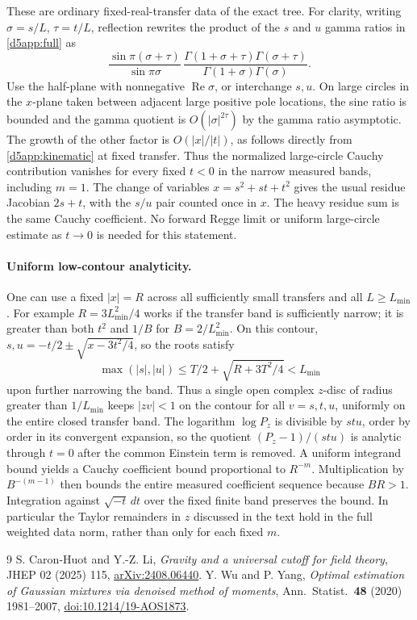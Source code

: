 \documentclass[11pt]{article}
\begin{document}
These are ordinary fixed-real-transfer data of the exact tree.
For clarity, writing \(\sigma=s/L\), \(\tau=t/L\), reflection
rewrites the product of the \(s\) and \(u\) gamma ratios in
\eqref{d5app:full} as
\[
 \frac{\sin\pi(\sigma+\tau)}{\sin\pi\sigma}\,
 \frac{\Gamma(1+\sigma+\tau)\Gamma(\sigma+\tau)}
      {\Gamma(1+\sigma)\Gamma(\sigma)} .
\]
Use the half-plane with nonnegative \(\operatorname{Re}\sigma\),
or interchange \(s,u\). On large circles in the \(x\)-plane taken
between adjacent large positive pole locations, the sine ratio is
bounded and the gamma quotient is \(O(|\sigma|^{2\tau})\) by the
gamma ratio asymptotic. The growth of the other factor is
\(O(|x|/|t|)\), as follows directly from
\eqref{d5app:kinematic} at fixed transfer. Thus the normalized
large-circle Cauchy contribution vanishes for every fixed
\(t<0\) in the narrow measured bands, including \(m=1\). The
change of variables \(x=s^2+st+t^2\) gives the usual residue
Jacobian \(2s+t\), with the \(s/u\) pair counted once in \(x\).
The heavy residue sum is the same Cauchy coefficient. No
forward Regge limit or uniform large-circle estimate as \(t\to0\)
is needed for this statement.

\paragraph{Uniform low-contour analyticity.}
One can use a fixed \(|x|=R\) across all sufficiently small
transfers and all \(L\ge L_{\min}\). For example \(R=3L_{\min}^2/4\)
works if the transfer band is sufficiently narrow; it is greater
than both \(t^2\) and \(1/B\) for \(B=2/L_{\min}^2\). On this
contour, \(s,u=-t/2\pm\sqrt{x-3t^2/4}\), so the roots satisfy
\[
 \max(|s|,|u|)\le T/2+\sqrt{R+3T^2/4}<L_{\min}
\]
upon further narrowing the band. Thus a single open complex
\(z\)-disc of radius greater than \(1/L_{\min}\) keeps
\(|zv|<1\) on the contour for all \(v=s,t,u\), uniformly on
the entire closed transfer band.
The logarithm \(\log P_z\) is divisible by \(stu\), order by
order in its convergent expansion, so the quotient
\((P_z-1)/(stu)\) is analytic through \(t=0\) after the common
Einstein term is removed. A uniform integrand bound yields
a Cauchy coefficient bound proportional to \(R^{-m}\).
Multiplication by \(B^{-(m-1)}\) then bounds the entire measured
coefficient sequence because \(BR>1\). Integration against
\(\sqrt{-t}\,dt\) over the fixed finite band preserves the
bound. In particular the Taylor remainders in \(z\) discussed
in the text hold in the full weighted data norm, rather than
only for each fixed \(m\).
\begin{thebibliography}{9}
S. Caron-Huot and Y.-Z. Li, \emph{Gravity and a universal cutoff for field theory},
JHEP 02 (2025) 115, \href{https://arxiv.org/abs/2408.06440}{arXiv:2408.06440}.
Y. Wu and P. Yang, \emph{Optimal estimation of Gaussian mixtures via denoised method of moments},
Ann.\ Statist.\ \textbf{48} (2020) 1981--2007, \href{https://doi.org/10.1214/19-AOS1873}{doi:10.1214/19-AOS1873}.
\end{thebibliography}
\end{document}
